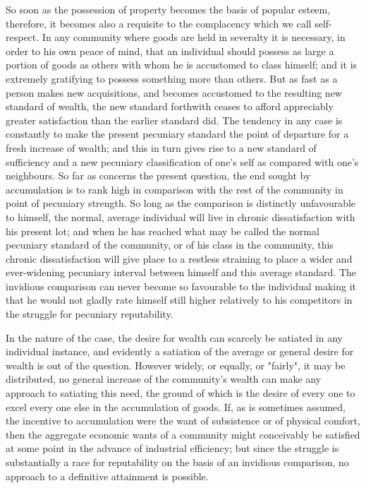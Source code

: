 \documentclass[12pt]{report}
\begin{document}
So soon as the possession of property becomes the basis of popular
esteem, therefore, it becomes also a requisite to the complacency which
we call self-respect. In any community where goods are held in severalty
it is necessary, in order to his own peace of mind, that an individual
should possess as large a portion of goods as others with whom he is
accustomed to class himself; and it is extremely gratifying to
possess something more than others. But as fast as a person makes new
acquisitions, and becomes accustomed to the resulting new standard of
wealth, the new standard forthwith ceases to afford appreciably greater
satisfaction than the earlier standard did. The tendency in any case is
constantly to make the present pecuniary standard the point of departure
for a fresh increase of wealth; and this in turn gives rise to a new
standard of sufficiency and a new pecuniary classification of one's
self as compared with one's neighbours. So far as concerns the present
question, the end sought by accumulation is to rank high in comparison
with the rest of the community in point of pecuniary strength. So long
as the comparison is distinctly unfavourable to himself, the normal,
average individual will live in chronic dissatisfaction with his present
lot; and when he has reached what may be called the normal pecuniary
standard of the community, or of his class in the community, this
chronic dissatisfaction will give place to a restless straining to place
a wider and ever-widening pecuniary interval between himself and
this average standard. The invidious comparison can never become so
favourable to the individual making it that he would not gladly rate
himself still higher relatively to his competitors in the struggle for
pecuniary reputability.

In the nature of the case, the desire for wealth can scarcely be
satiated in any individual instance, and evidently a satiation of the
average or general desire for wealth is out of the question. However
widely, or equally, or "fairly", it may be distributed, no general
increase of the community's wealth can make any approach to satiating
this need, the ground of which is the desire of every one to excel every
one else in the accumulation of goods. If, as is sometimes assumed, the
incentive to accumulation were the want of subsistence or of physical
comfort, then the aggregate economic wants of a community might
conceivably be satisfied at some point in the advance of industrial
efficiency; but since the struggle is substantially a race for
reputability on the basis of an invidious comparison, no approach to
a definitive attainment is possible.
\end{document}
